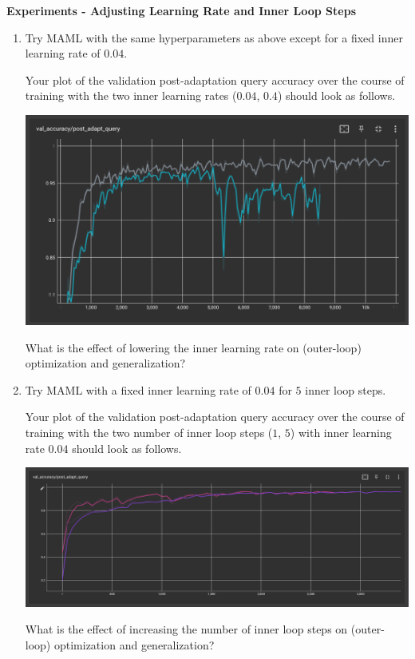 \item {} {\bf Experiments - Adjusting Learning Rate and Inner Loop Steps}

\begin{enumerate}[label=(\roman*)]
    \item Try MAML with the same hyperparameters as above except for a fixed inner learning rate of $0.04$.

    Your plot of the validation post-adaptation query accuracy over the course of training with the two inner learning rates ($0.04$, $0.4$) should look as follows.
    \begin{center}
        \includegraphics[width=0.75\linewidth]{./figures/maml_q3}
    \end{center}
    
    What is the effect of lowering the inner learning rate on (outer-loop) optimization and generalization?

    \item Try MAML with a fixed inner learning rate of $0.04$ for $5$ inner loop steps.

    Your plot of the validation post-adaptation query accuracy over the course of training with the two number of inner loop steps ($1$, $5$) with inner learning rate $0.04$ should look as follows.
    \begin{center}
        \includegraphics[width=0.75\linewidth]{./figures/maml_q4}
    \end{center}

    What is the effect of increasing the number of inner loop steps on (outer-loop) optimization and generalization?


\end{enumerate}
